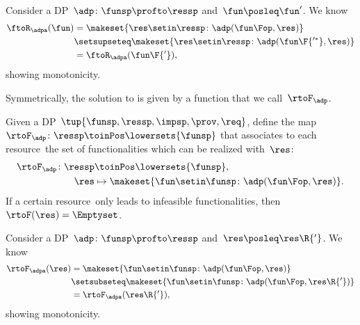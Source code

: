 \begin{remark}[Monotonicity]
    Consider a DP~$\adp\colon\funsp\profto\ressp$ and~$\fun\posleq \fun'$.
    We know
    \begin{equation}
        \begin{aligned}
            \ftoR_\adpa(\fun) & =\makeset{ \res \setin \ressp \colon \adp(\fun\Fop, \res)} \\
                              & \setsupseteq \makeset{ \res \setin \ressp \colon \adp(\fun\F{'^*}, \res)} \\
                              & =\ftoR_\adpa(\fun\F{'}),
        \end{aligned}
    \end{equation}
    showing monotonicity.
\end{remark}

Symmetrically, the solution to \FixResMaxFun is given by a function that we call~$\rtoF_\adp$.

\begin{definition}
    \label{def:rtoF-dp}
    Given a DP~$\tup{\funsp,\ressp,\impsp,\prov,\req}$, define the map~$\rtoF_{\adp}\colon \ressp\toinPos \lowersets{\funsp}$ that associates to each resource~\res the set of functionalities which can be realized with~$\res$:
    \begin{equation}
        \begin{aligned}
            \rtoF_{\adp}\colon \ressp & \toinPos \lowersets{\funsp}, \\
            \res                      & \mapsto \makeset{ \fun \setin \funsp \colon \adp(\fun\Fop, \res)}.
        \end{aligned}
    \end{equation}
    If a certain resource~\res only leads to infeasible functionalities, then~$\rtoF(\res)=\Emptyset$.
\end{definition}

\begin{remark}[Monotonicity]
    Consider a DP~$\adp\colon\funsp\profto\ressp$ and~$\res\posleq \res\R{'}$.
    We know
    \begin{equation}
        \begin{aligned}
            \rtoF_\adpa(\res) & =\makeset{ \fun \setin \funsp \colon \adp(\fun\Fop, \res)} \\
                              & \setsubseteq \makeset{ \fun \setin \funsp \colon \adp(\fun\Fop, \res\R{'})} \\
                              & =\rtoF_\adpa(\res\R{'}),
        \end{aligned}
    \end{equation}
    showing monotonicity.
\end{remark}

